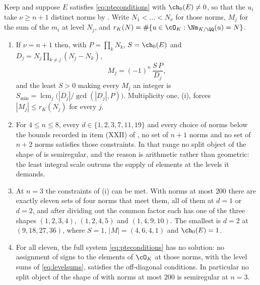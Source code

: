 \begin{theorem}\label{thm:pterange}
Keep  and suppose $E$ satisfies \eqref{eq:pteconditions} with
$\ch_{0}(E)\ne0$, so that the $u_{i}$ take $\nu\ge n+1$ distinct norms by
. Write $N_{1}<\dots<N_{\nu}$ for those norms, $M_{j}$ for
the sum of the $m_{i}$ at level $N_{j}$, and
$r_{K}(N)=\#\{u\in\cO_{K}:\Nm_{K/\QQ}(u)=N\}$.
\begin{enumerate}[label=\textup{(\roman*)},leftmargin=2.6em]
\item If $\nu=n+1$ then, with $P=\prod_{k}N_{k}$, $S=\ch_{0}(E)$ and
  $D_{j}=N_{j}\prod_{k\ne j}(N_{j}-N_{k})$,
  \begin{equation}\label{eq:levelsums}
    M_{j}=(-1)^{n}\,\frac{S\,P}{D_{j}},
  \end{equation}
  and the least $S>0$ making every $M_{j}$ an integer is
  $S_{\min}=\operatorname{lcm}_{j}\bigl(|D_{j}|/\gcd(|D_{j}|,P)\bigr)$.
  Multiplicity one, (i), forces
  $|M_{j}|\le r_{K}(N_{j})$ for every $j$.
\item For $4\le n\le8$, every $d\in\{1,2,3,7,11,19\}$ and every choice of
  norms below the bounds recorded in item (XXII) of ,
  no set of $n+1$ norms and no set of $n+2$ norms satisfies those constraints.
  In that range no split object of the shape of  is
  semiregular, and the reason is arithmetic rather than geometric: the least
  integral scale outruns the supply of elements at the levels it demands.
\item At $n=3$ the constraints of (i) can be met. With norms at most $200$
  there are exactly eleven sets of four norms that meet them, all of them at
  $d=1$ or $d=2$, and after dividing out the common factor each has one of the
  three shapes $(1,2,3,4)$, $(1,2,4,5)$ and $(1,4,9,10)$. The smallest is
  $d=2$ at $(9,18,27,36)$, where $S=1$, $|M|=(4,6,4,1)$ and $\ch_{0}(E)=1$.
\item For all eleven, the full system \eqref{eq:pteconditions} has no
  solution: no assignment of signs to the elements of $\cO_{K}$ at those
  norms, with the level sums of \eqref{eq:levelsums}, satisfies the
  off-diagonal conditions. In particular no split object of the shape of
   with norms at most $200$ is semiregular at $n=3$.
\end{enumerate}
\end{theorem}

